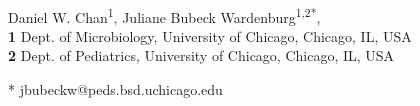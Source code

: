 \documentclass[10pt,letterpaper]{article}
\date{}
\begin{document}
\vspace*{0.2in}

\begin{flushleft}
{\Large
\textbf{} %
}
\newline
\\
Daniel W. Chan\textsuperscript{1},
Juliane Bubeck Wardenburg\textsuperscript{1,2*},
\\
\bigskip
\textbf{1} Dept. of Microbiology, University of Chicago, Chicago, IL, USA
\\
\textbf{2} Dept. of Pediatrics, University of Chicago, Chicago, IL, USA
\\
\bigskip

% 
%





* jbubeckw@peds.bsd.uchicago.edu

\end{flushleft}
\end{document}

